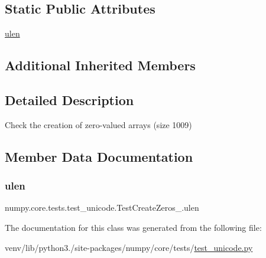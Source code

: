 \subsection*{Static Public Attributes}
\begin{DoxyCompactItemize}
\item 
\hyperlink{classnumpy_1_1core_1_1tests_1_1test__unicode_1_1TestCreateZeros__1009_abfd9610ba5b298a395f61691bcf88f67}{ulen}
\end{DoxyCompactItemize}
\subsection*{Additional Inherited Members}


\subsection{Detailed Description}
\begin{DoxyVerb}Check the creation of zero-valued arrays (size 1009)\end{DoxyVerb}
 

\subsection{Member Data Documentation}
\mbox{\label{classnumpy_1_1core_1_1tests_1_1test__unicode_1_1TestCreateZeros__1009_abfd9610ba5b298a395f61691bcf88f67}} 
\subsubsection{\texorpdfstring{ulen}{ulen}}
{\footnotesize\ttfamily numpy.\+core.\+tests.\+test\+\_\+unicode.\+Test\+Create\+Zeros\+\_.\+ulen\hspace{0.3cm}{\ttfamily [static]}}



The documentation for this class was generated from the following file\+:\begin{DoxyCompactItemize}
\item 
venv/lib/python3./site-\/packages/numpy/core/tests/\hyperlink{test__unicode_8py}{test\+\_\+unicode.\+py}\end{DoxyCompactItemize}

